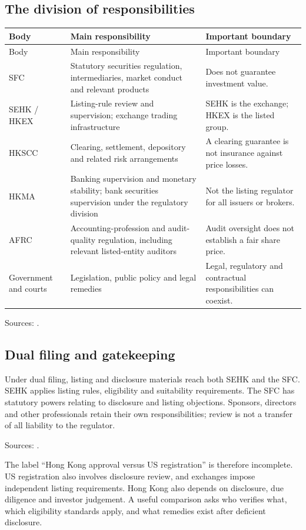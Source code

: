 \documentclass[11pt,a4paper]{article}
\newcommand{\source}[1]{\par{\footnotesize\color{ink}Sources: \cite{#1}.}\par}
\begin{document}
\subsection{The division of responsibilities}
\begin{longtable}{@{}L{3.0cm}L{7.1cm}L{5.4cm}@{}}
\toprule Body & Main responsibility & Important boundary\\\midrule\endfirsthead
\toprule Body & Main responsibility & Important boundary\\\midrule\endhead
SFC & Statutory securities regulation, intermediaries, market conduct and relevant products & Does not guarantee investment value.\\
SEHK / HKEX & Listing-rule review and supervision; exchange trading infrastructure & SEHK is the exchange; HKEX is the listed group.\\
HKSCC & Clearing, settlement, depository and related risk arrangements & A clearing guarantee is not insurance against price losses.\\
HKMA & Banking supervision and monetary stability; bank securities supervision under the regulatory division & Not the listing regulator for all issuers or brokers.\\
AFRC & Accounting-profession and audit-quality regulation, including relevant listed-entity auditors & Audit oversight does not establish a fair share price.\\
Government and courts & Legislation, public policy and legal remedies & Legal, regulatory and contractual responsibilities can coexist.\\
\bottomrule
\end{longtable}
\source{sfcreg,afrc}

\subsection{Dual filing and gatekeeping}
Under dual filing, listing and disclosure materials reach both SEHK and the SFC. SEHK applies listing rules, eligibility and suitability requirements. The SFC has statutory powers relating to disclosure and listing objections. Sponsors, directors and other professionals retain their own responsibilities; review is not a transfer of all liability to the regulator.\source{dualfiling}

The label ``Hong Kong approval versus US registration'' is therefore incomplete. US registration also involves disclosure review, and exchanges impose independent listing requirements. Hong Kong also depends on disclosure, due diligence and investor judgement. A useful comparison asks who verifies what, which eligibility standards apply, and what remedies exist after deficient disclosure.
\end{document}
